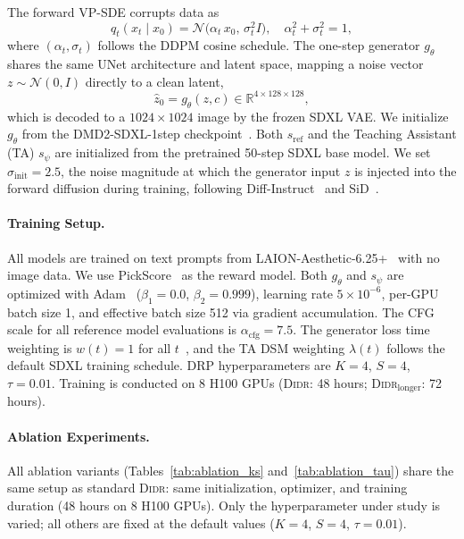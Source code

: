 The forward VP-SDE corrupts data as
\begin{equation}
q_t(x_t\mid x_0) = \mathcal{N}\!\bigl(\alpha_t\,x_0,\,\sigma_t^2 I\bigr), \quad \alpha_t^2+\sigma_t^2=1,
\end{equation}
where $(\alpha_t,\sigma_t)$ follows the DDPM cosine schedule. The one-step generator $g_\theta$ shares the same UNet architecture and latent space, mapping a noise vector $z\sim\mathcal{N}(0,I)$ directly to a clean latent,
\begin{equation}
\hat{z}_0 = g_\theta(z,c) \in \mathbb{R}^{4\times128\times128},
\end{equation}
which is decoded to a $1024\times1024$ image by the frozen SDXL VAE. We initialize $g_\theta$ from the DMD2-SDXL-1step checkpoint~\citep{yin2024improved}. Both $s_{\mathrm{ref}}$ and the Teaching Assistant (TA) $s_\psi$ are initialized from the pretrained 50-step SDXL base model. We set $\sigma_{\mathrm{init}}=2.5$, the noise magnitude at which the generator input $z$ is injected into the forward diffusion during training, following Diff-Instruct~\citep{Luo2023DiffInstructAU} and SiD~\citep{zhou2024score}.

\paragraph{Training Setup.}
All models are trained on text prompts from LAION-Aesthetic-6.25+~\citep{zhou2024long} with no image data. We use PickScore~\citep{pickscore} as the reward model. Both $g_\theta$ and $s_\psi$ are optimized with Adam~\citep{kingma2014adam} ($\beta_1=0.0$, $\beta_2=0.999$), learning rate $5\times10^{-6}$, per-GPU batch size 1, and effective batch size 512 via gradient accumulation. The CFG scale for all reference model evaluations is $\alpha_{\mathrm{cfg}}=7.5$. The generator loss time weighting is $w(t)=1$ for all $t$~\citep{Luo2023DiffInstructAU}, and the TA DSM weighting $\lambda(t)$ follows the default SDXL training schedule. DRP hyperparameters are $K=4$, $S=4$, $\tau=0.01$. Training is conducted on 8 H100 GPUs (\textsc{Didr}: 48 hours; \textsc{Didr}$_{\mathrm{longer}}$: 72 hours).

\paragraph{Ablation Experiments.}
All ablation variants (Tables~\ref{tab:ablation_ks} and~\ref{tab:ablation_tau}) share the same setup as standard \textsc{Didr}: same initialization, optimizer, and training duration (48 hours on 8 H100 GPUs). Only the hyperparameter under study is varied; all others are fixed at the default values ($K=4$, $S=4$, $\tau=0.01$).

